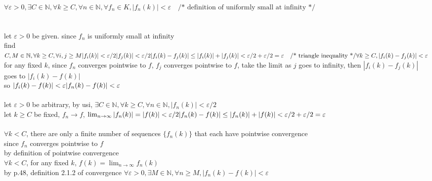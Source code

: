 \documentclass[12pt, border = 4pt, multi]{article} %
\begin{document}
$\forall \varepsilon > 0, \exists C \in \mathbb{N}, \forall k \geq C, \forall n \in \mathbb{N}, \forall f_n \in K, |f_n(k)| < \varepsilon \quad \text{/* definition of uniformly small at infinity */}$\\
\\
\\
let $\varepsilon > 0$ be given. since $f_n$ is uniformly small at infinity\\
find $C, M \in \mathbb{N}, \forall k \geq C, \forall i, j \geq M\\
|f_i(k)| < \varepsilon / 2\\
|f_j(k)| < \varepsilon / 2\\
|f_i(k) - f_j(k)| \leq |f_i(k)| + |f_j(k)| < \varepsilon / 2 + \varepsilon / 2 = \varepsilon \quad \text{/* triangle inequality */}\\
\\
\forall k \geq C, |f_i(k) - f_j(k)| < \varepsilon\\$
for any fixed $k$, since $f_n$ converges pointwise to $f$, $f_j$ converges pointwise to $f$, take the limit as $j$ goes to infinity, then $|f_i(k) - f_j(k)|$ goes to $|f_i(k) - f(k)|$\\
so $|f_i(k) - f(k)| < \varepsilon\\
|f_n(k) - f(k)| < \varepsilon$\\
\\
let $\varepsilon > 0$ be arbitrary, by usi, $\exists C \in \mathbb{N}, \forall k \geq C, \forall n \in \mathbb{N}, |f_n(k)| < \varepsilon / 2$\\
let $k \geq C$ be fixed, $f_n \rightarrow f$, $\lim_{n \rightarrow \infty} |f_n(k)| = |f(k)| < \varepsilon / 2\\
|f_n(k) - f(k)| \leq |f_n(k)| + |f(k)| < \varepsilon / 2 + \varepsilon / 2 = \varepsilon\\$
\\
\\
$\forall k < C$, there are only a finite number of sequences $\{f_n(k)\}$ that each have pointwise convergence\\
since $f_n$ converges pointwise to $f$\\
by definition of pointwise convergence\\
$\forall k < C$, for any fixed $k$, $f(k) = \lim_{n \rightarrow \infty} f_n(k)$\\
by p.48, definition 2.1.2 of convergence $\forall \varepsilon > 0, \exists M \in \mathbb{N}, \forall n \geq M, |f_n(k) - f(k)| < \varepsilon$\\
\end{document}
